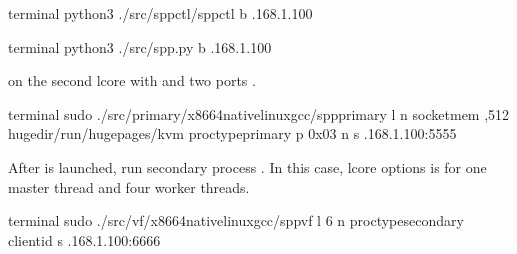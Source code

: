 \documentclass[a4paper,11pt,openany,oneside,english]{sphinxmanual}
\begin{document}
\begin{sphinxVerbatim}[commandchars=\\\{\},formatcom=\footnotesize]
 terminal 
 python3 ./src/spp\PYGZhy{}ctl/spp\PYGZhy{}ctl \PYGZhy{}b .168.1.100
\end{sphinxVerbatim}

\begin{sphinxVerbatim}[commandchars=\\\{\},formatcom=\footnotesize]
 terminal 
 python3 ./src/spp.py \PYGZhy{}b .168.1.100
\end{sphinxVerbatim}

 on the second lcore with  and two ports .

\begin{sphinxVerbatim}[commandchars=\\\{\},formatcom=\footnotesize]
 terminal 
 sudo ./src/primary/x86\PYGZus{}64\PYGZhy{}native\PYGZhy{}linux\PYGZhy{}gcc/spp\PYGZus{}primary 
    \PYGZhy{}l  \PYGZhy{}n  
    \PYGZhy{}\PYGZhy{}socket\PYGZhy{}mem ,512 
    \PYGZhy{}\PYGZhy{}huge\PYGZhy{}dir/run/hugepages/kvm 
    \PYGZhy{}\PYGZhy{}proc\PYGZhy{}typeprimary 
    \PYGZhy{}\PYGZhy{} 
    \PYGZhy{}p 0x03 
    \PYGZhy{}n  \PYGZhy{}s .168.1.100:5555
\end{sphinxVerbatim}

After  is launched, run secondary process .
In this case, lcore options is  for one master thread and four
worker threads.

\begin{sphinxVerbatim}[commandchars=\\\{\},formatcom=\footnotesize]
 terminal 
 sudo ./src/vf/x86\PYGZus{}64\PYGZhy{}native\PYGZhy{}linux\PYGZhy{}gcc/spp\PYGZus{}vf 
   \PYGZhy{}l \PYGZhy{}6 
   \PYGZhy{}n  \PYGZhy{}\PYGZhy{}proc\PYGZhy{}typesecondary 
   \PYGZhy{}\PYGZhy{} 
   \PYGZhy{}\PYGZhy{}client\PYGZhy{}id  
   \PYGZhy{}s .168.1.100:6666 
\end{sphinxVerbatim}
\end{document}
